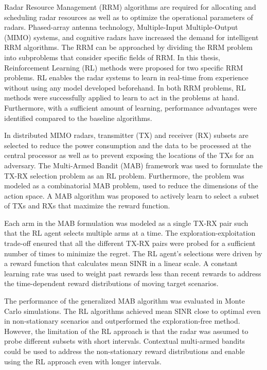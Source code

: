\documentclass[english, 12pt, a4paper, elec, utf8, a-1b, online]{aaltothesis}
\numberwithin{equation}{section}
\begin{document}
Radar Resource Management (RRM) algorithms are required for allocating and scheduling radar resources as well as to optimize the operational parameters of radars.  
Phased-array antenna technology, Multiple-Input Multiple-Output (MIMO) systems, and cognitive radars have increased the demand for intelligent RRM algorithms.
The RRM can be approached by dividing the RRM problem into subproblems that consider specific fields of RRM.
In this thesis, Reinforcement Learning (RL) methods were proposed for two specific RRM problems.
RL enables the radar systems to learn in real-time from experience without using any model developed beforehand.
In both RRM problems, RL methods were successfully applied to learn to act in the problems at hand. 
Furthermore, with a sufficient amount of learning, performance advantages were identified compared to the baseline algorithms.

In distributed MIMO radars, transmitter (TX) and receiver (RX) subsets are selected to reduce the power consumption and the data to be processed at the central processor as well as to prevent exposing the locations of the TXs for an adversary.
The Multi-Armed Bandit (MAB) framework was used to formulate the TX-RX selection problem as an RL problem.
Furthermore, the problem was modeled as a combinatorial MAB problem, used to reduce the dimensions of the action space.
A MAB algorithm was proposed to actively learn to select a subset of TXs and RXs that maximize the reward function.

Each arm in the MAB formulation was modeled as a single TX-RX pair such that the RL agent selects multiple arms at a time. 
The exploration-exploitation trade-off ensured that all the different TX-RX pairs were probed for a sufficient number of times to minimize the regret. 
The RL agent's selections were driven by a reward function that calculates mean SINR in a linear scale.
A constant learning rate was used to weight past rewards less than recent rewards to address the time-dependent reward distributions of moving target scenarios.

The performance of the generalized MAB algorithm was evaluated in Monte Carlo simulations.
The RL algorithms achieved mean SINR close to optimal even in non-stationary scenarios and outperformed the exploration-free method.
However, the limitation of the RL approach is that the radar was assumed to probe different subsets with short intervals.
Contextual multi-armed bandits \cite{Lu2010} could be used to address the non-stationary reward distributions and enable using the RL approach even with longer intervals. 
\end{document}
